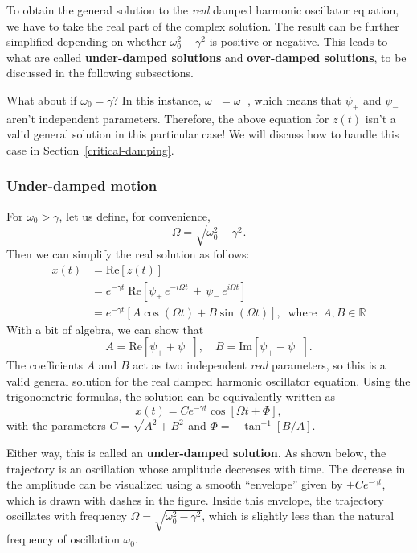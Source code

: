 \documentclass[10pt,a4paper]{article}
\begin{document}
To obtain the general solution to the \emph{real} damped harmonic
oscillator equation, we have to take the real part of the complex
solution. The result can be further simplified depending on whether
$\omega_0^2 - \gamma^2$ is positive or negative. This leads to what
are called \textbf{under-damped solutions} and \textbf{over-damped
solutions}, to be discussed in the following subsections.

What about if $\omega_0 = \gamma$? In this instance, $\omega_+ =
\omega_-$, which means that $\psi_+$ and $\psi_-$ aren't independent
parameters. Therefore, the above equation for $z(t)$ isn't a valid
general solution in this particular case!  We will discuss how to
handle this case in Section~\ref{critical-damping}.

\subsubsection{Under-damped motion}\label{under-damped-motion}

For $\omega_0 > \gamma$, let us define, for convenience,
\begin{equation}
\Omega = \sqrt{\omega_0^2 - \gamma^2}.
\end{equation}
Then we can simplify the real solution as follows:
\begin{align}
  x(t) &= \mathrm{Re}\left[z(t)\right] \\ &= e^{-\gamma t} \; \mathrm{Re}\left[\psi_+ \, e^{-i \Omega t} \,+\, \psi_- \, e^{i\Omega t}\right] \\ &= e^{-\gamma t} \left[ A\cos\left(\Omega t\right) + B \sin\left(\Omega t\right)\right], \;\;\mathrm{where}\;\; A, B \in \mathbb{R}
\end{align}
With a bit of algebra, we can show that
\begin{equation}
A = \mathrm{Re}\left[\psi_+ + \psi_-\right], \quad B = \mathrm{Im}\left[\psi_+ - \psi_-\right].
\end{equation}
The coefficients $A$ and $B$ act as two independent \emph{real}
parameters, so this is a valid general solution for the real damped
harmonic oscillator equation. Using the trigonometric formulas, the
solution can be equivalently written as
\begin{equation}
x(t) = C e^{-\gamma t} \cos\left[\Omega t + \Phi\right],
\end{equation}
with the parameters $C = \sqrt{A^2 + B^2}$ and
$\Phi = - \tan^{-1}\left[B/A\right]$.

Either way, this is called an \textbf{under-damped solution}. As shown
below, the trajectory is an oscillation whose amplitude decreases with
time. The decrease in the amplitude can be visualized using a smooth
``envelope'' given by $\pm C e^{-\gamma t}$, which is drawn with
dashes in the figure. Inside this envelope, the trajectory oscillates
with frequency $\Omega = \sqrt{\omega_0^2 - \gamma^2}$, which is
slightly less than the natural frequency of oscillation $\omega_0$.
\end{document}
